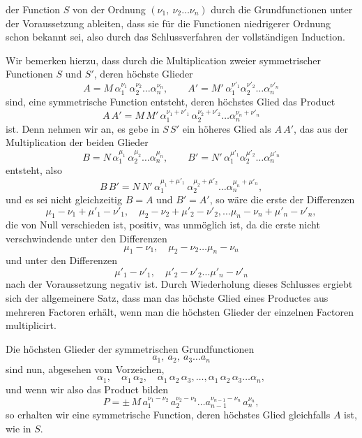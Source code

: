 der Function $S$ von der Ordnung $(\nu_1,\ \nu_2 \ldots \nu_n)$ durch die
Grundfunctionen unter der Voraussetzung ableiten, dass sie f\"ur die
Functionen niedrigerer Ordnung schon bekannt sei, also durch das
Schlussverfahren der vollst\"andigen Induction.

Wir bemerken hierzu, dass durch die Multiplication zweier
symmetrischer Functionen $S$ und $S'$, deren h\"ochste Glieder
\[
A = M\,\alpha_1^{\nu_1}\,\alpha_2^{\nu_2} \ldots \alpha_n^{\nu_n},\qquad
A' = M'\,\alpha_1^{\nu'_1}\alpha_2^{\nu'_2} \ldots \alpha_n^{\nu'_n}
\]
sind, eine symmetrische Function entsteht, deren h\"ochstes Glied
das Product
\[
A\,A' = M\,M'\,\alpha_1^{\nu_1+\nu'_1}\,\alpha_2^{\nu_2+\nu'_2} \ldots \alpha_n^{\nu_n+\nu'_n}
\]
ist. Denn nehmen wir an, es gebe in $S\,S'$ ein h\"oheres Glied
als $A\,A'$, das aus der Multiplication der beiden Glieder
\[
B = N\,\alpha_1^{\mu_1}\,\alpha_2^{\mu_2} \ldots \alpha_n^{\mu_n},\qquad
B' = N'\,\alpha_1^{\mu'_1}\alpha_2^{\mu'_2} \ldots \alpha_n^{\mu'_n}
\]
entsteht, also
\[
B\,B' = N\,N'\,\alpha_1^{\mu_1+\mu'_1}\,\alpha_2^{\mu_2+\mu'_2} \ldots \alpha_n^{\mu_n+\mu'_n},
\]
und es sei nicht gleichzeitig $B = A$ und $B' = A'$, so w\"are die
erste der Differenzen
\[
\mu_1 - \nu_1 + \mu'_1 - \nu'_1,\quad \mu_2 - \nu_2 + \mu'_2 - \nu'_2, \ldots \mu_n - \nu_n + \mu'_n - \nu'_n,
\]
die von Null verschieden ist, positiv, was unm\"oglich ist, da die
erste nicht verschwindende unter den Differenzen
\[
\mu_1 - \nu_1,\quad \mu_2 - \nu_2 \ldots \mu_n - \nu_n
\]
und unter den Differenzen
\[
\mu'_1 - \nu'_1,\quad \mu'_2 - \nu'_2 \ldots \mu'_n - \nu'_n
\]
nach der Voraussetzung negativ ist. Durch Wiederholung dieses
Schlusses ergiebt sich der allgemeinere Satz, dass man das
h\"ochste Glied eines Productes aus mehreren Factoren erh\"alt,
wenn man die h\"ochsten Glieder der einzelnen Factoren multi\-plicirt.

Die h\"ochsten Glieder der symmetrischen Grundfunctionen
\[
a_1,\ a_2,\ a_3 \ldots a_n
\]
sind nun, abgesehen vom Vorzeichen,
\[
\alpha_1,\quad \alpha_1\,\alpha_2,\quad \alpha_1\,\alpha_2\,\alpha_3, \ldots, \alpha_1\,\alpha_2\,\alpha_3 \ldots \alpha_n,
\]
und wenn wir also das Product bilden
\[
P = \pm\,M\,a_1^{\nu_1-\nu_2}\,a_2^{\nu_2-\nu_3} \ldots a_{n-1}^{\nu_{n-1}-\nu_n}\,a_n^{\nu_n},
\]
so erhalten wir eine symmetrische Function, deren h\"ochstes
Glied gleichfalls $A$ ist, wie in $S$.
